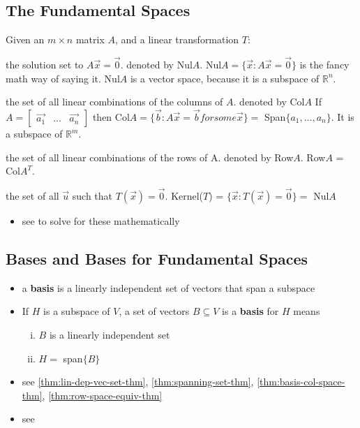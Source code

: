 \documentclass[a4paper,12pt]{article}
\theoremstyle{definition}
\theoremstyle{definition}
\newcommand{\mateq}[3]{#1#2 = #3}
\newcommand{\mateqaxb}{\mateq{A}{\vec{x}}{\vec{b}}}
\newcommand{\mateqaxo}{\mateq{A}{\vec{x}}{\vec{0}}}
\newcommand{\finitevecs}[2]{#1_1,\ldots,#1_#2}
\newcommand{\finitevecsset}[2]{\{\finitevecs{#1}{#2}\}}
\begin{document}
	\subsection{The Fundamental Spaces}
	Given an $m \times n$ matrix $A$, and a linear transformation $T$:
	\begin{description}[style=nextline]
		\item[null space] the solution set to $\mateqaxo$. denoted by Nul$A$. Nul$A = \{\vec{x}: \mateqaxo\}$ is the fancy math way of saying it. Nul$A$ is a vector space, because it is a subspace of $\mathbb{R}^n$.
		
		\item[column space] the set of all linear combinations of the columns of $A$. denoted by Col$A$ If $A =
		\begin{bmatrix}
			\vec{a_1} & \ldots & \vec{a_n}
		\end{bmatrix}$
		then Col$A = \{\vec{b} : \mateqaxb for some \vec{x}\} =$ Span$\finitevecsset{a}{n}$. It is a subspace of $\mathbb{R}^m$.
		
		\item[row space] the set of all linear combinations of the rows of A. denoted by Row$A$. Row$A$ = Col$A^T$.
		
		\item[kernel] the set of all $\vec{u}$ such that $\mateq{T}{(\vec{x})}{\vec{0}}$. Kernel($T$) = $\{\vec{x}: T(\vec{x}) = \vec{0}\} =$ Nul$A$
	\end{description}
	
	\begin{itemize}
		\item see  to solve for these mathematically
	\end{itemize}
	
	\subsection{Bases and Bases for Fundamental Spaces}
	\begin{itemize}
		\item a \textbf{basis} is a linearly independent set of vectors that span a subspace
		
		\item If $H$ is a subspace of $V$, a set of vectors $B \subseteq V$ is a \textbf{basis} for $H$ means
		\begin{enumerate}[i.]
			\item $B$ is a linearly independent set
			\item $H =$ span$\{B\}$
		\end{enumerate}
		
		\item see \autoref{thm:lin-dep-vec-set-thm}, \autoref{thm:spanning-set-thm}, \autoref{thm:basis-col-space-thm},
		\autoref{thm:row-space-equiv-thm}
		
		\item see 
	\end{itemize}
	\newpage
	
\end{document}
